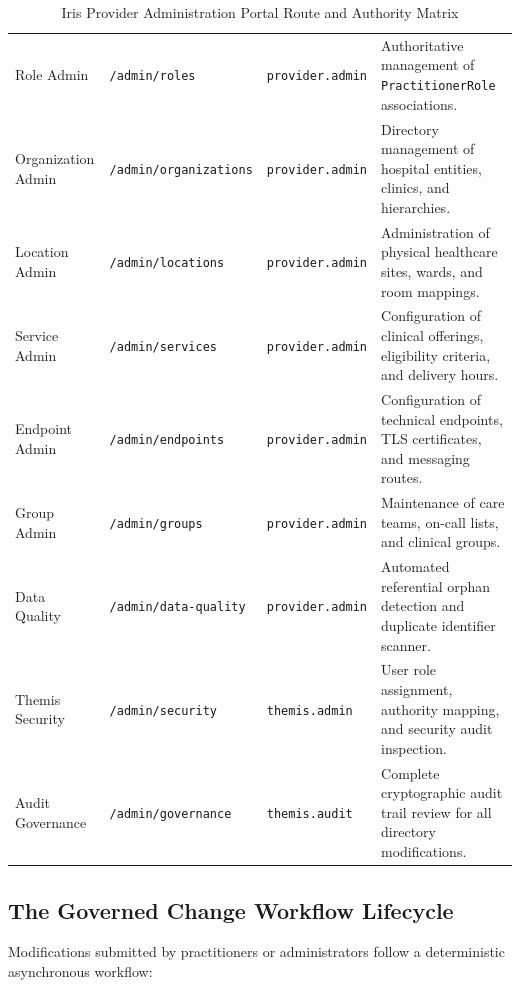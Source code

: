\begin{table}[htbp]
\begin{tabularx}{\textwidth}{l l p{3.2cm} X}
Role Admin & \texttt{/admin/roles} & \texttt{provider.admin} & Authoritative management of \texttt{PractitionerRole} associations. \\
Organization Admin & \texttt{/admin/organizations} & \texttt{provider.admin} & Directory management of hospital entities, clinics, and hierarchies. \\
Location Admin & \texttt{/admin/locations} & \texttt{provider.admin} & Administration of physical healthcare sites, wards, and room mappings. \\
Service Admin & \texttt{/admin/services} & \texttt{provider.admin} & Configuration of clinical offerings, eligibility criteria, and delivery hours. \\
Endpoint Admin & \texttt{/admin/endpoints} & \texttt{provider.admin} & Configuration of technical endpoints, TLS certificates, and messaging routes. \\
Group Admin & \texttt{/admin/groups} & \texttt{provider.admin} & Maintenance of care teams, on-call lists, and clinical groups. \\
Data Quality & \texttt{/admin/data-quality} & \texttt{provider.admin} & Automated referential orphan detection and duplicate identifier scanner. \\
Themis Security & \texttt{/admin/security} & \texttt{themis.admin} & User role assignment, authority mapping, and security audit inspection. \\
Audit Governance & \texttt{/admin/governance} & \texttt{themis.audit} & Complete cryptographic audit trail review for all directory modifications. \\
\bottomrule
\end{tabularx}
\caption{Iris Provider Administration Portal Route and Authority Matrix}
\label{tab:admin_routes}
\end{table}

\subsection{The Governed Change Workflow Lifecycle}

Modifications submitted by practitioners or administrators follow a deterministic asynchronous workflow:


